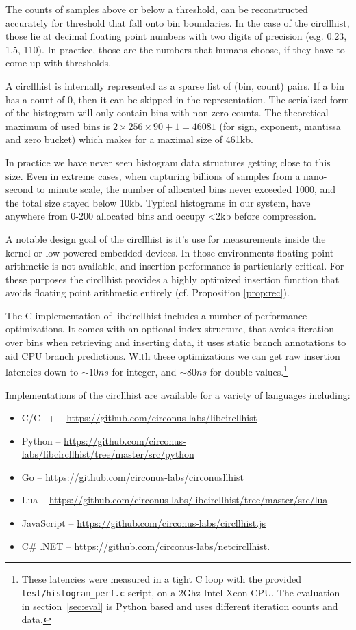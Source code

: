 \documentclass{article}
\theoremstyle{plain}
\theoremstyle{remark}
\begin{document}
The counts of samples above or below a threshold, can be reconstructed accurately for threshold
that fall onto bin boundaries. In the case of the circllhist, those lie at decimal floating point
numbers with two digits of precision (e.g. 0.23, 1.5, 110). In practice, those are the numbers
that humans choose, if they have to come up with thresholds.

A circllhist is internally represented as a sparse list of (bin, count) pairs.  If a bin has a count
of 0, then it can be skipped in the representation.  The serialized form of the histogram will only
contain bins with non-zero counts.  The theoretical maximum of used bins is $2 \times 256 \times 90
+ 1 = 46081$ (for sign, exponent, mantissa and zero bucket) which makes for a maximal size of 461kb.

In practice we have never seen histogram data structures getting close to this size.  Even in
extreme cases, when capturing billions of samples from a nano-second to minute scale, the number of
allocated bins never exceeded 1000, and the total size stayed below 10kb.
Typical histograms in our system, have anywhere from 0-200 allocated bins and occupy <2kb before
compression.

A notable design goal of the circllhist is it's use for measurements inside the kernel or
low-powered embedded devices.  In those environments floating point arithmetic is not available, and
insertion performance is particularly critical. For these purposes the circllhist provides a highly
optimized insertion function that avoids floating point arithmetic entirely (cf. Proposition
\ref{prop:rec}).

The C implementation of libcircllhist includes a number of performance optimizations.  It comes with
an optional index structure, that avoids iteration over bins when retrieving and inserting data, it
uses static branch annotations to aid CPU branch predictions.  With these optimizations we can get
raw insertion latencies down to $\sim 10ns$ for integer, and $\sim 80ns$ for double
values.\footnote{ These latencies were measured in a tight C loop with the provided
\texttt{test/histogram\_perf.c} script, on a 2Ghz Intel Xeon CPU.  The evaluation in
section~\ref{sec:eval} is Python based and uses different iteration counts and data. }

Implementations of the circllhist are available for a variety of languages including:
\begin{itemize}
\item C/C++ -- \url{https://github.com/circonus-labs/libcircllhist}
\item Python -- \url{https://github.com/circonus-labs/libcircllhist/tree/master/src/python}
\item Go -- \url{https://github.com/circonus-labs/circonusllhist}
\item Lua -- \url{https://github.com/circonus-labs/libcircllhist/tree/master/src/lua}
\item JavaScript -- \url{https://github.com/circonus-labs/circllhist.js}
\item C\# .NET -- \url{https://github.com/circonus-labs/netcircllhist}.
\end{itemize}
\end{document}

